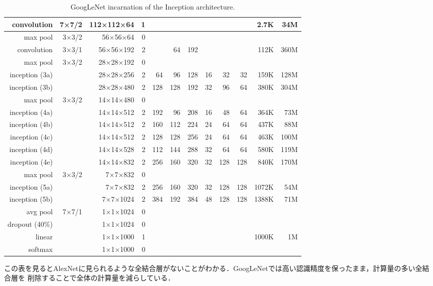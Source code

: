 {\begin{table}[p]
  \begin{center}
  \caption{GoogLeNet incarnation of the Inception architecture.}
  \label{table:googlenet}
  \begin{tabular}{|r|r|r|r|r|r|r|r|r|r|r|r|} \hline
  convolution & 7×7/2 & 112×112×64 & 1 &  &  &  &  &  &  & 2.7K & 34M \\ \hline
  max pool & 3×3/2 & 56×56×64 & 0 &  &  &  &  &  &  &  &  \\ \hline
  convolution & 3×3/1 & 56×56×192 & 2 &  & 64 & 192 &  &  &  & 112K & 360M  \\ \hline
  max pool & 3×3/2 & 28×28×192 & 0 &  &  &  &  &  &  &  & \\ \hline
  inception (3a) &  & 28×28×256 & 2 & 64 & 96 & 128 & 16 & 32 & 32 & 159K & 128M \\ \hline
  inception (3b) &  & 28×28×480 & 2 & 128 & 128 & 192 & 32 & 96 & 64 & 380K & 304M \\ \hline
  max pool & 3×3/2 & 14×14×480 & 0 &  &  &  &  &  &  &  &  \\ \hline
  inception (4a) &  & 14×14×512 & 2 & 192 & 96 & 208 & 16 & 48 & 64 & 364K & 73M \\ \hline
  inception (4b) &  & 14×14×512 & 2 & 160 & 112 & 224 & 24 & 64 & 64 & 437K & 88M \\ \hline
  inception (4c) &  & 14×14×512 & 2 & 128 & 128 & 256 & 24 & 64 & 64 & 463K & 100M \\ \hline
  inception (4d) &  & 14×14×528 & 2 & 112 & 144 & 288 & 32 & 64 & 64 & 580K & 119M \\ \hline
  inception (4e) &  & 14×14×832 & 2 & 256 & 160 & 320 & 32 & 128 & 128 & 840K & 170M \\ \hline
  max pool & 3×3/2 & 7×7×832 & 0 &  &  &  &  &  &  &  &  \\ \hline
  inception (5a) &  & 7×7×832 & 2 & 256 & 160 & 320 & 32 & 128 & 128 & 1072K & 54M \\ \hline
  inception (5b) &  & 7×7×1024 & 2 & 384 & 192 & 384 & 48 & 128 & 128 & 1388K & 71M \\ \hline
  avg pool & 7×7/1 & 1×1×1024 & 0 &  &  &  &  &  &  &  &  \\ \hline
  dropout (40\%) &  & 1×1×1024 & 0 &  &  &  &  &  &  &  &  \\ \hline
  linear &  & 1×1×1000 & 1 &  &  &  &  &  &  & 1000K & 1M \\ \hline
  softmax &  & 1×1×1000 & 0 &  &  &  &  &  &  &  &  \\ \hline
  \end{tabular}
  \end{center}
  \end{table}
  

この表を見るとAlexNetに見られるような全結合層がないことがわかる．GoogLeNetでは高い認識精度を保ったまま，計算量の多い全結合層を
削除することで全体の計算量を減らしている．
}